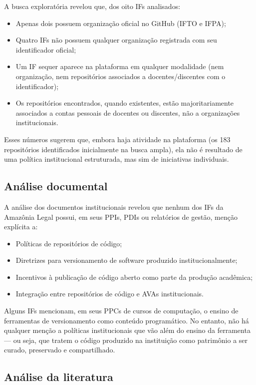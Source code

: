 \documentclass[english, spanish, brazilian]{RBIEarticle}
\begin{document}
	A busca exploratória revelou que, dos oito IFs analisados:
	\begin{itemize}
		\item Apenas dois possuem organização oficial no GitHub (IFTO e IFPA);
		\item Quatro IFs não possuem qualquer organização registrada com seu identificador oficial;
		\item Um IF sequer aparece na plataforma em qualquer modalidade (nem organização, nem repositórios associados a docentes/discentes com o identificador);
		\item Os repositórios encontrados, quando existentes, estão majoritariamente associados a contas pessoais de docentes ou discentes, não a organizações institucionais.
	\end{itemize}
	
	Esses números sugerem que, embora haja atividade na plataforma (os 183 repositórios identificados inicialmente na busca ampla), ela não é resultado de uma política institucional estruturada, mas sim de iniciativas individuais.
	
	\subsection{Análise documental}
	
	A análise dos documentos institucionais revelou que nenhum dos IFs da Amazônia Legal possui, em seus PPIs, PDIs ou relatórios de gestão, menção explícita a:
	\begin{itemize}
		\item Políticas de repositórios de código;
		\item Diretrizes para versionamento de software produzido institucionalmente;
		\item Incentivos à publicação de código aberto como parte da produção acadêmica;
		\item Integração entre repositórios de código e AVAs institucionais.
	\end{itemize}
	
	Alguns IFs mencionam, em seus PPCs de cursos de computação, o ensino de ferramentas de versionamento como conteúdo programático. No entanto, não há qualquer menção a políticas institucionais que vão além do ensino da ferramenta — ou seja, que tratem o código produzido na instituição como patrimônio a ser curado, preservado e compartilhado.
		
	\subsection{Análise da literatura}
	
\end{document}
